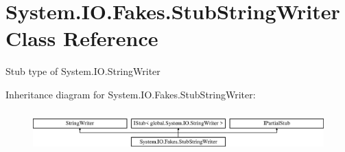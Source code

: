 \hypertarget{class_system_1_1_i_o_1_1_fakes_1_1_stub_string_writer}{\section{System.\-I\-O.\-Fakes.\-Stub\-String\-Writer Class Reference}
\label{class_system_1_1_i_o_1_1_fakes_1_1_stub_string_writer}
}


Stub type of System.\-I\-O.\-String\-Writer 


Inheritance diagram for System.\-I\-O.\-Fakes.\-Stub\-String\-Writer\-:\begin{figure}[H]
\begin{center}
\leavevmode
\includegraphics[height=1.568627cm]{class_system_1_1_i_o_1_1_fakes_1_1_stub_string_writer}
\end{center}
\end{figure}
